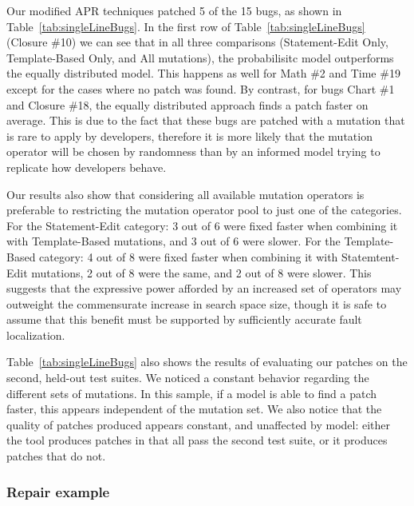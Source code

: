 \documentclass[conference]{IEEEtran}
\begin{document}
Our modified APR techniques patched 5 of the 15 bugs, as shown in 
Table~\ref{tab:singleLineBugs}. In the first row of Table~\ref{tab:singleLineBugs} (Closure \#10) we can see
that in all three comparisons (Statement-Edit Only, Template-Based Only, and All
mutations), the probabilisitc model outperforms
the equally distributed model. This happens as well for
Math \#2 and Time \#19 except for the cases where no patch was
found. By contrast, for bugs Chart \#1 and Closure \#18, the equally
distributed approach finds a patch faster on average. This is due to the fact
that these bugs are patched with a mutation that is rare to apply by developers,
therefore it is more likely that the mutation operator will be chosen by randomness
than by an informed model trying to replicate how developers behave.

Our results also show that considering all available mutation operators is
preferable to 
restricting the mutation operator pool to just one of the categories. For the
Statement-Edit category: 3 out of 6 were fixed faster when combining it with
Template-Based mutations, and 3 out of 6 were slower. For the Template-Based
category: 4 out of 8 were fixed faster when combining it with Statemtent-Edit
mutations, 2 out of 8 were the same, and 2 out of 8 were slower. This suggests
that the expressive power afforded by an increased set of operators may
outweight the commensurate increase in search space size, though it is safe to
assume that this benefit must be supported by sufficiently accurate fault
localization. 

Table~\ref{tab:singleLineBugs} also shows the results of evaluating our patches
on the second, held-out test suites. We noticed a
constant behavior regarding the different sets of mutations. In this sample, if
a model is able to find a patch faster, this appears independent of the mutation
set.  We also notice that
the quality of patches produced  appears constant, and unaffected by model:
either the tool produces patches in 
that all pass the second test suite, or it produces patches that do not. 

\subsubsection{Repair example} \label{examPatches}
\end{document}
